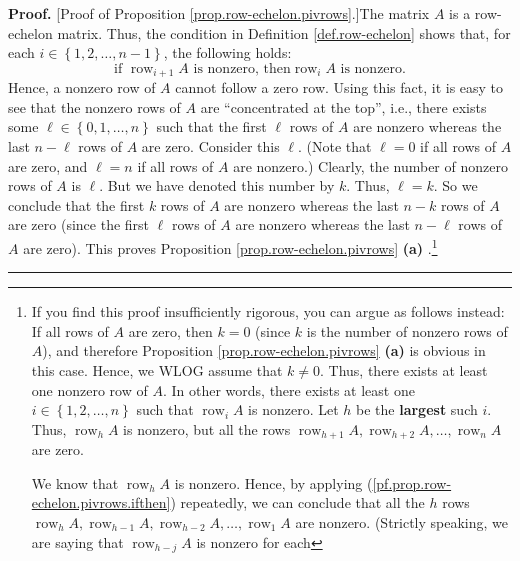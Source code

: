 \documentclass[numbers=enddot,12pt,final,onecolumn,notitlepage]{scrartcl}%
\theoremstyle{definition}
\newenvironment{proof}[1][Proof]{\noindent\textbf{#1.} }{\ \rule{0.5em}{0.5em}}
\begin{document}
\begin{proof}
[Proof of Proposition \ref{prop.row-echelon.pivrows}.]The matrix $A$ is a
row-echelon matrix. Thus, the condition in Definition \ref{def.row-echelon}
shows that, for each $i\in\left\{  1,2,\ldots,n-1\right\}  $, the following
holds:%
\begin{equation}
\text{if }\operatorname*{row}\nolimits_{i+1}A\text{ is nonzero, then
}\operatorname*{row}\nolimits_{i}A\text{ is nonzero.}
\label{pf.prop.row-echelon.pivrows.ifthen}%
\end{equation}
Hence, a nonzero row of $A$ cannot follow a zero row. Using this fact, it is
easy to see that the nonzero rows of $A$ are \textquotedblleft concentrated at
the top\textquotedblright, i.e., there exists some $\ell\in\left\{
0,1,\ldots,n\right\}  $ such that the first $\ell$ rows of $A$ are nonzero
whereas the last $n-\ell$ rows of $A$ are zero. Consider this $\ell$. (Note
that $\ell=0$ if all rows of $A$ are zero, and $\ell=n$ if all rows of $A$ are
nonzero.) Clearly, the number of nonzero rows of $A$ is $\ell$. But we have
denoted this number by $k$. Thus, $\ell=k$. So we conclude that the first $k$
rows of $A$ are nonzero whereas the last $n-k$ rows of $A$ are zero (since the
first $\ell$ rows of $A$ are nonzero whereas the last $n-\ell$ rows of $A$ are
zero). This proves Proposition \ref{prop.row-echelon.pivrows} \textbf{(a)}%
.\footnote{If you find this proof insufficiently rigorous, you can argue as
follows instead: If all rows of $A$ are zero, then $k=0$ (since $k$ is the
number of nonzero rows of $A$), and therefore Proposition
\ref{prop.row-echelon.pivrows} \textbf{(a)} is obvious in this case. Hence, we
WLOG assume that $k\neq0$. Thus, there exists at least one nonzero row of $A$.
In other words, there exists at least one $i\in\left\{  1,2,\ldots,n\right\}
$ such that $\operatorname*{row}\nolimits_{i}A$ is nonzero. Let $h$ be the
\textbf{largest} such $i$. Thus, $\operatorname*{row}\nolimits_{h}A$ is
nonzero, but all the rows $\operatorname*{row}\nolimits_{h+1}%
A,\operatorname*{row}\nolimits_{h+2}A,\ldots,\operatorname*{row}%
\nolimits_{n}A$ are zero.
\par
We know that $\operatorname*{row}\nolimits_{h}A$ is nonzero. Hence, by
applying (\ref{pf.prop.row-echelon.pivrows.ifthen}) repeatedly, we can
conclude that all the $h$ rows $\operatorname*{row}\nolimits_{h}%
A,\operatorname*{row}\nolimits_{h-1}A,\operatorname*{row}\nolimits_{h-2}%
A,\ldots,\operatorname*{row}\nolimits_{1}A$ are nonzero. (Strictly speaking,
we are saying that $\operatorname*{row}\nolimits_{h-j}A$ is nonzero for each
}
\end{proof}
\end{document}
